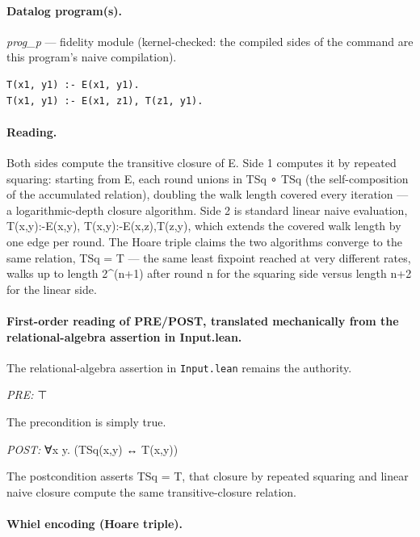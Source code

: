 \documentclass[10pt]{article}
\begin{document}
\paragraph{Datalog program(s).}

{\raggedright\textit{prog\_p} --- fidelity module (kernel-checked: the compiled sides of the command are this program's naive compilation).\par}

\begin{Verbatim}[fontsize=\scriptsize,breaklines=true,breakanywhere=true,frame=single,framesep=1.5mm]
T(x1, y1) :- E(x1, y1).
T(x1, y1) :- E(x1, z1), T(z1, y1).
\end{Verbatim}

\paragraph{Reading.} Both sides compute the transitive closure of E. Side 1 computes it by repeated squaring: starting from E, each round unions in TSq ∘ TSq (the self-composition of the accumulated relation), doubling the walk length covered every iteration --- a logarithmic-depth closure algorithm. Side 2 is standard linear naive evaluation, T(x,y):-E(x,y), T(x,y):-E(x,z),T(z,y), which extends the covered walk length by one edge per round. The Hoare triple claims the two algorithms converge to the same relation, TSq = T --- the same least fixpoint reached at very different rates, walks up to length 2\textasciicircum{}(n+1) after round n for the squaring side versus length n+2 for the linear side.

\paragraph{First-order reading of PRE/POST, translated mechanically from the relational-algebra assertion in Input.lean.} The relational-algebra assertion in \texttt{Input.lean} remains the authority.

\textit{PRE:} ⊤\par The precondition is simply true.

\textit{POST:} ∀x y. (TSq(x,y) ↔ T(x,y))\par The postcondition asserts TSq = T, that closure by repeated squaring and linear naive closure compute the same transitive-closure relation.

\paragraph{Whiel encoding (Hoare triple).}
\end{document}
